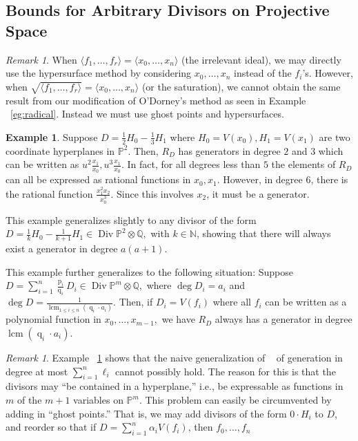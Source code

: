 \documentclass{amsart}
\theoremstyle{plain}
\theoremstyle{definition}
\newtheorem{example}[thm]{Example}
\theoremstyle{remark}
\newtheorem{rem}[thm]{Remark}
\numberwithin{equation}{section}
\newcommand\ssec{\subsection}
\newcommand\bn{{\mathbb N}}
\newcommand\bq{{\mathbb Q}}
\newcommand\bp{{\mathbb P}}
\DeclareMathOperator\di{Div}
\newcommand\bida{a}
\DeclareMathOperator{\num}{p}
\DeclareMathOperator{\den}{q}
\DeclareMathOperator{\lcm}{lcm}
\begin{document}


\ssec{Bounds for Arbitrary Divisors on Projective Space}
\begin{rem}
When $\langle f_1, \ldots, f_r \rangle = \langle x_0, \ldots, x_n \rangle$ (the irrelevant ideal), we may directly use the hypersurface method by considering $x_0, \ldots, x_n$ instead of the $f_i$'s. However, when $\sqrt{\langle f_1, \ldots, f_r \rangle} = \langle x_0, \ldots, x_n \rangle$ (or the saturation), we cannot obtain the same result from our modification of O'Dorney's method as seen in Example ~\ref{eg:radical}. Instead we must use ghost points and hypersurfaces.
\end{rem} 

\begin{example}
\label{eg:hyperplane}
Suppose $D = \frac{1}{2}H_0 - \frac{1}{3}H_1$ where $H_0 = V(x_0), H_1 = V(x_1)$ are two coordinate hyperplanes in $\bp^2$. Then, $R_D$ has generators in degree $2$ and $3$ which can be written as $u^2 \frac{x_1}{x_0}, u^3 \frac{x_1}{x_0}.$ In fact, for all degrees less than $5$ the elements of $R_D$ can all be expressed as rational functions in $x_0, x_1$. However, in degree $6$, there is the rational function $\frac{x_1^2 x_2}{x_0^3}.$ Since this involves $x_2$, it must be a generator.

This example generalizes slightly to any divisor of the form $D = \frac{1}{k}H_0 - \frac{1}{k+1}H_1 \in \di \bp^2 \otimes \bq,$ with $k \in \bn$, showing that there will always exist a generator in degree $a(a+1).$

This example further generalizes to the following situation: Suppose $D = \sum_{i=1}^{n} \frac{\num_i}{\den_i}D_i \in \di \bp^m \otimes \bq,$ where $\deg D_i = \bida_i$ and  $\deg D = \frac{1}{\lcm_{1 \leq i \leq n}(\den_i \cdot \bida_i)}$. Then, if $D_i = V(f_i)$ where all $f_i$ can be written as a polynomial function in $x_0, \ldots, x_{m-1},$ we have $R_D$ always has a generator in degree $\lcm(\den_i \cdot \bida_i)$.
\end{example}

\begin{rem}
\label{rem:ghost-motivation}
Example ~\ref{eg:hyperplane} shows that the naive generalization of ~\cite[Theorem 8]{dorney:canonical} of generation in degree at most $\sum_{i=1}^{n}\ell_i$ cannot possibly hold. The reason for this is that the divisors may ``be contained in a hyperplane,'' i.e., be expressable as functions in $m$ of the $m+1$ variables on $\bp^m$. This problem can easily be circumvented by adding in ``ghost points.'' That is, we may add divisors of the form $0 \cdot H_i$ to $D$, and reorder so that if $D = \sum_{i=1}^{n}\alpha_i V(f_i)$, then $f_0, \ldots, f_n$
\end{rem}
\end{document}
